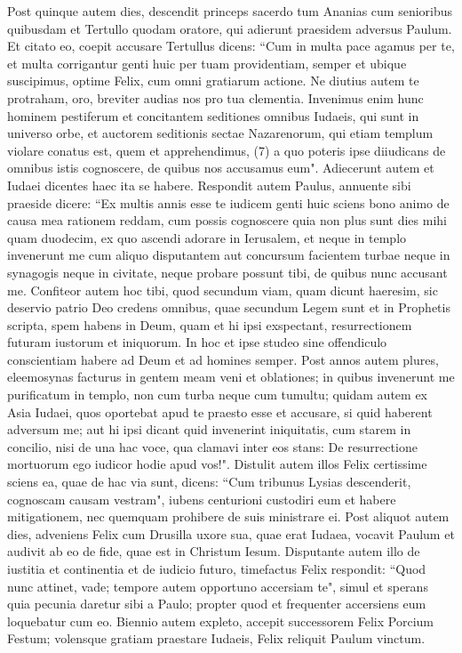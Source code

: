 \begin{biblechapter}  
\verse Post quinque autem dies, descendit princeps sacerdo tum Ananias cum senioribus quibusdam et Tertullo quodam oratore, qui adierunt praesidem adversus Paulum. 
\verse Et citato eo, coepit accusare Tertullus dicens: “Cum in multa pace agamus per te, et multa corrigantur genti huic per tuam providentiam, 
\verse semper et ubique suscipimus, optime Felix, cum omni gratiarum actione. 
\verse Ne diutius autem te protraham, oro, breviter audias nos pro tua clementia. 
\verse Invenimus enim hunc hominem pestiferum et concitantem seditiones omnibus Iudaeis, qui sunt in universo orbe, et auctorem seditionis sectae Nazarenorum,  
\verse qui etiam templum violare conatus est, quem et apprehendimus, (7) 
\verse a quo poteris ipse diiudicans de omnibus istis cognoscere, de quibus nos accusamus eum". 
\verse Adiecerunt autem et Iudaei dicentes haec ita se habere. 
\verse Respondit autem Paulus, annuente sibi praeside dicere: “Ex multis annis esse te iudicem genti huic sciens bono animo de causa mea rationem reddam, 
\verse cum possis cognoscere quia non plus sunt dies mihi quam duodecim, ex quo ascendi adorare in Ierusalem, 
\verse et neque in templo invenerunt me cum aliquo disputantem aut concursum facientem turbae neque in synagogis neque in civitate,  
\verse neque probare possunt tibi, de quibus nunc accusant me. 
\verse Confiteor autem hoc tibi, quod secundum viam, quam dicunt haeresim, sic deservio patrio Deo credens omnibus, quae secundum Legem sunt et in Prophetis scripta, 
\verse spem habens in Deum, quam et hi ipsi exspectant, resurrectionem futuram iustorum et iniquorum. 
\verse In hoc et ipse studeo sine offendiculo conscientiam habere ad Deum et ad homines semper. 
\verse Post annos autem plures, eleemosynas facturus in gentem meam veni et oblationes; 
\verse in quibus invenerunt me purificatum in templo, non cum turba neque cum tumultu; 
\verse quidam autem ex Asia Iudaei, quos oportebat apud te praesto esse et accusare, si quid haberent adversum me; 
\verse aut hi ipsi dicant quid invenerint iniquitatis, cum starem in concilio, 
\verse nisi de una hac voce, qua clamavi inter eos stans: De resurrectione mortuorum ego iudicor hodie apud vos!". 
\verse Distulit autem illos Felix certissime sciens ea, quae de hac via sunt, dicens: “Cum tribunus Lysias descenderit, cognoscam causam vestram", 
\verse iubens centurioni custodiri eum et habere mitigationem, nec quemquam prohibere de suis ministrare ei. 
\verse Post aliquot autem dies, adveniens Felix cum Drusilla uxore sua, quae erat Iudaea, vocavit Paulum et audivit ab eo de fide, quae est in Christum Iesum.  
\verse Disputante autem illo de iustitia et continentia et de iudicio futuro, timefactus Felix respondit: “Quod nunc attinet, vade; tempore autem opportuno accersiam te", 
\verse simul et sperans quia pecunia daretur sibi a Paulo; propter quod et frequenter accersiens eum loquebatur cum eo. 
\verse Biennio autem expleto, accepit successorem Felix Porcium Festum; volensque gratiam praestare Iudaeis, Felix reliquit Paulum vinctum. 
\end{biblechapter}


